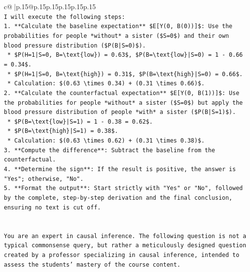 \documentclass{article}
\begin{document}
{\begin{supertabular}{c@{$\;$}|p{.15\linewidth}@{}p{.15\linewidth}p{.15\linewidth}p{.15\linewidth}p{.15\linewidth}p{.15\linewidth}}
{{{\\ 
\texttt{I will execute the following steps:} \\
\texttt{1.  **Calculate the baseline expectation** \$E{[}Y(0, B(0)){]}\$: Use the probabilities for people *without* a sister (\$S=0\$) and their own blood pressure distribution (\$P(B|S=0)\$).} \\
\texttt{    *   \$P(H=1|S=0, B=\textbackslash{}text\{low\}) = 0.63\$, \$P(B=\textbackslash{}text\{low\}|S=0) = 1 {-} 0.66 = 0.34\$.} \\
\texttt{    *   \$P(H=1|S=0, B=\textbackslash{}text\{high\}) = 0.31\$, \$P(B=\textbackslash{}text\{high\}|S=0) = 0.66\$.} \\
\texttt{    *   Calculation: \$(0.63 \textbackslash{}times 0.34) + (0.31 \textbackslash{}times 0.66)\$.} \\
\texttt{2.  **Calculate the counterfactual expectation** \$E{[}Y(0, B(1)){]}\$: Use the probabilities for people *without* a sister (\$S=0\$) but apply the blood pressure distribution of people *with* a sister (\$P(B|S=1)\$).} \\
\texttt{    *   \$P(B=\textbackslash{}text\{low\}|S=1) = 1 {-} 0.38 = 0.62\$.} \\
\texttt{    *   \$P(B=\textbackslash{}text\{high\}|S=1) = 0.38\$.} \\
\texttt{    *   Calculation: \$(0.63 \textbackslash{}times 0.62) + (0.31 \textbackslash{}times 0.38)\$.} \\
\texttt{3.  **Compute the difference**: Subtract the baseline from the counterfactual.} \\
\texttt{4.  **Determine the sign**: If the result is positive, the answer is "Yes"; otherwise, "No".} \\
\texttt{5.  **Format the output**: Start strictly with "Yes" or "No", followed by the complete, step{-}by{-}step derivation and the final conclusion, ensuring no text is cut off.} \\
\\ 
\\ 
\texttt{You are an expert in causal inference. The following question is not a typical commonsense query, but rather a meticulously designed question created by a professor specializing in causal inference, intended to assess the students' mastery of the course content.} \\
}}}
\end{supertabular}}
\end{document}
